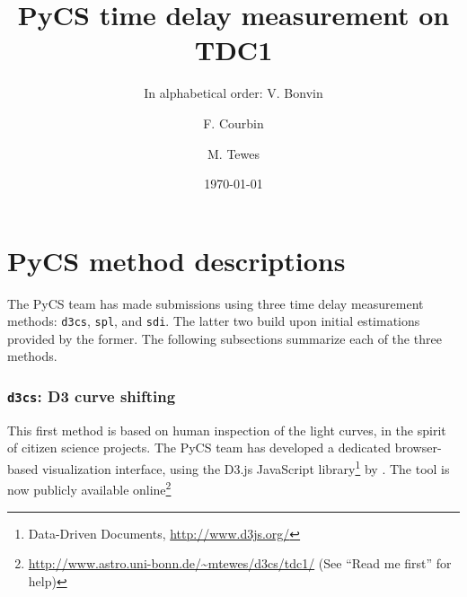 \documentclass[traditabstract]{aa}
\begin{document}
\title{PyCS time delay measurement on TDC1}
\author{ In alphabetical order:
V. Bonvin\inst{\ref{epfl}} \and
F. Courbin\inst{\ref{epfl}} \and
M. Tewes\inst{\ref{bonn}}
}


\date{\today}

\maketitle



\section{PyCS method descriptions}



The PyCS team has made submissions using three time delay measurement
methods: {\tt d3cs}, {\tt spl}, and {\tt sdi}. The latter two build
upon initial estimations provided by the former. The following subsections
summarize each of the three methods.

\subsubsection{{\tt d3cs}: D3 curve shifting}

This first method is based on human inspection of the light curves, in
the spirit of citizen science projects. The PyCS team has developed a dedicated
browser-based visualization interface, using the D3.js JavaScript
library\footnote{Data-Driven Documents, \url{http://www.d3js.org/}} by
\citet{d3}. The tool is now publicly available
online\footnote{\url{http://www.astro.uni-bonn.de/~mtewes/d3cs/tdc1/}
(See ``Read me first'' for help)} 
\end{document}
